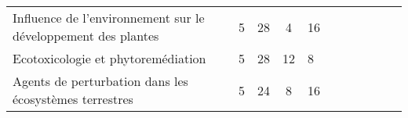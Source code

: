 \begin{tabular}{|m{5cm}|cm{0.75cm}|cm{0.75cm}|cm{0.75cm}|cm{0.75cm}|cm{0.75cm}|}
 \cellcolor{couleurClaire} \color{couleurTexte} Influence de l'environnement sur le développement des plantes & \cellcolor{couleurClaire} \color{couleurTexte} 5 & \cellcolor{couleurClaire} \color{couleurTexte} 28 & \cellcolor{couleurClaire} \color{couleurTexte} 4 & \cellcolor{couleurClaire} \color{couleurTexte} 16 \\ \cline{1-5}

 \color{black} Ecotoxicologie et phytoremédiation & \color{black} 5 & \color{black} 28 & \color{black} 12 & \color{black} 8 \\ \cline{1-5}

 \cellcolor{couleurClaire} \color{couleurTexte} Agents de perturbation dans les écosystèmes 
  terrestres & \cellcolor{couleurClaire} \color{couleurTexte} 5 & \cellcolor{couleurClaire} \color{couleurTexte} 24 & \cellcolor{couleurClaire} \color{couleurTexte} 8 & \cellcolor{couleurClaire} \color{couleurTexte} 16 \\ \cline{1-5}

\end{tabular}


